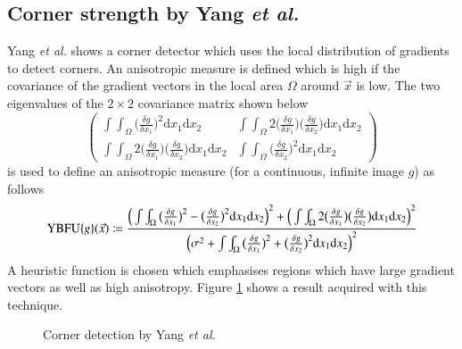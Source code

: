 \documentclass[a4paper,12pt]{book}
\begin{document}
\subsection{Corner strength by Yang \emph{et al.}}
Yang \emph{et al.}\cite{RefWorks:370} shows a corner detector which uses the local
distribution of gradients to detect corners. An anisotropic measure is defined
which is high if the covariance of the gradient vectors in the local area
$\Omega$ around $\vec{x}$ is low. The two
eigenvalues of the $2\times 2$ covariance matrix shown below
\begin{equation*}
  \begin{pmatrix}
    \int\int_{\Omega}\big(\frac{\delta g}{\delta x_1}\big)^2
    \mathrm{d}x_1\mathrm{d}x_2 &
    \int\int_{\Omega}2\big(\frac{\delta g}{\delta x_1}\big)
    \big(\frac{\delta g}{\delta x_2}\big)\mathrm{d}x_1\mathrm{d}x_2\\
    \int\int_{\Omega}2\big(\frac{\delta g}{\delta x_1}\big)
    \big(\frac{\delta g}{\delta x_2}\big)\mathrm{d}x_1\mathrm{d}x_2 &
    \int\int_{\Omega}\big(\frac{\delta g}{\delta x_2}\big)^2
    \mathrm{d}x_1\mathrm{d}x_2
  \end{pmatrix}
\end{equation*}
is used to define an anisotropic measure (for a continuous, infinite image $g$)
as follows
\begin{equation*}
  \mathrm{YBFU}\{g\}(\vec{x})\coloneqq
  \cfrac{\Big(\int\int_{\Omega}\big(\frac{\delta g}{\delta x_1}\big)^2-
    \big(\frac{\delta g}{\delta x_2}\big)^2\mathrm{d}x_1\mathrm{d}x_2\Big)^2+
    \Big(\int\int_{\Omega}2\big(\frac{\delta g}{\delta x_1}\big)
      \big(\frac{\delta g}{\delta x_2}\big)\mathrm{d}x_1\mathrm{d}x_2\Big)^2}
    {\Big(\sigma^2+\int\int_{\Omega}\big(\frac{\delta g}{\delta x_1}\big)^2+
    \big(\frac{\delta g}{\delta x_2}\big)^2\mathrm{d}x_1\mathrm{d}x_2\Big)^2}
\end{equation*}
A heuristic function is chosen which emphasises regions which have
large gradient vectors as well as high anisotropy. Figure \ref{fig:ybfu}
shows a result acquired with this technique.
\begin{figure}[htbp]
   \begin{center}
     \begin{minipage}[c]{.45\textwidth}
     \end{minipage}
     \begin{minipage}[c]{.45\textwidth}
       \resizebox{\textwidth}{!}{\texttt{[image: y\_b\_f\_u]}}
     \end{minipage}
     \caption{Corner detection by Yang \emph{et al.}\label{fig:ybfu}}
   \end{center}
\end{figure}
\end{document}
